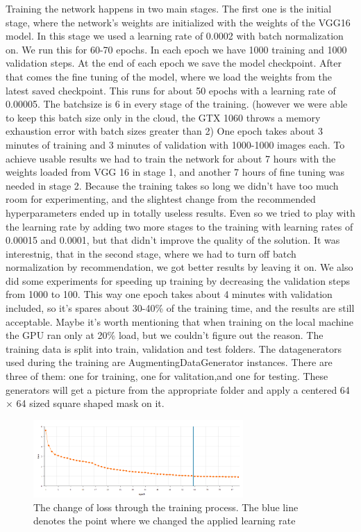 \documentclass[conference]{IEEEtran}
\begin{document}
Training the network happens in two main stages. The first one is the initial stage, where the network’s weights are initialized with the weights of the VGG16 model. In this stage we used a learning rate of 0.0002 with batch normalization on. We run this for 60-70 epochs. In each epoch we have 1000 training and 1000 validation steps. At the end of each epoch we save the model checkpoint. After that comes the fine tuning of the model, where we load the weights from the latest saved checkpoint. This runs for about 50 epochs with a learning rate of 0.00005. The batchsize is 6 in every stage of the training. (however we were able to keep this batch size only in the cloud, the GTX 1060 throws a memory exhaustion error with batch sizes greater than 2) One epoch takes about 3 minutes of training and 3 minutes of validation with 1000-1000 images each. To achieve usable results we had to train the network for about 7 hours with the weights loaded from VGG 16 in stage 1, and another 7 hours of fine tuning was needed in stage 2. Because the training takes so long we didn't have too much room for experimenting, and the slightest change from the recommended hyperparameters ended up in totally useless results. Even so we tried to play with the learning rate by adding two more stages to the training with learning rates of 0.00015 and 0.0001, but that didn't improve the quality of the solution. It was interestnig, that in the second stage, where we had to turn off batch normalization by recommendation, we got better results by leaving it on. We also did some experiments for speeding up training by decreasing the validation steps from 1000 to 100. This way one epoch takes about 4 minutes with validation included, so it's spares about 30-40\% of the training time, and the results are still acceptable. Maybe it's worth mentioning that when training on the local machine the GPU ran only at 20\% load, but we couldn't figure out the reason. The training data is split into train, validation and test folders. The datagenerators used during the training are AugmentingDataGenerator instances. There are three of them: one for training, one for valitation,and one for testing. These generators will get a picture from the appropriate folder and apply a centered 64 $\times$ 64 sized square shaped mask on it.

\begin{figure}[H]
  \centering
  \includegraphics[width=80mm, keepaspectratio]{figures/loss_change.png}
  \caption{The change of loss through the training process. The blue line denotes the point where we changed the applied learning rate}
\end{figure}
\pagebreak
\end{document}
